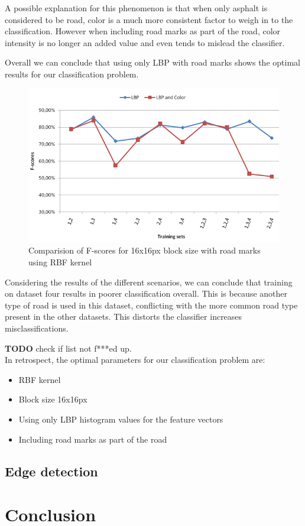 \documentclass[runningheads,a4paper]{llncs}
\begin{document}
A possible explanation for this phenomenon is that when only asphalt is considered to be road, color is a much more consistent factor to weigh in to the classification. However when including road marks as part of the road, color intensity is no longer an added value and even tends to mislead the classifier. 

Overall we can conclude that using only LBP with road marks shows the optimal results for our classification problem. 

\begin{figure}[h]
\centering
\includegraphics[width=\textwidth]{fig/16_wi_roadmarks.png}
\caption{Comparision of F-scores for 16x16px block size with road marks using RBF kernel }
\label{fig:16_wi_roadmarks}
\end{figure}

Considering the results of the different scenarios, we can conclude that training on dataset four results in poorer classification overall. This is because another type of road is used in this dataset, conflicting with the more common road type present in the other datasets. This distorts the classifier increases misclassifications.

\textbf{TODO} check if list not f***ed up.\\
\noindent In retrospect, the optimal parameters for our classification problem are:
\begin{itemize}
\item RBF kernel
\item Block size 16x16px
\item Using only LBP histogram values for the feature vectors
\item Including road marks as part of the road  
\end{itemize}

\subsection{Edge detection}

\section{Conclusion}
\newpage
{}

\end{document}

